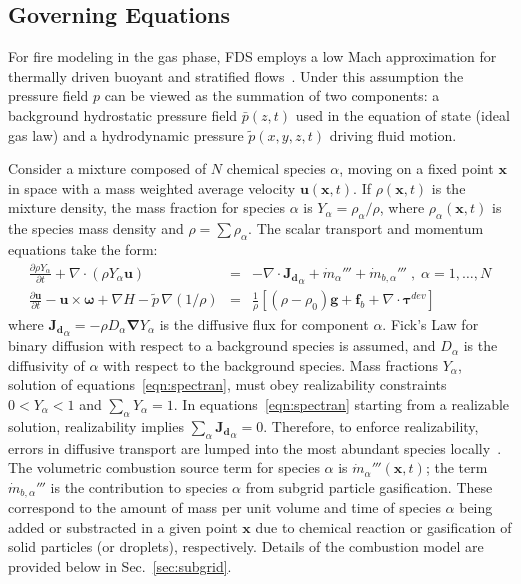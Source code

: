 \documentclass[journal,article,atmosphere,submit,moreauthors,pdftex]{Definitions/mdpi}
\begin{document}
\subsection{Governing Equations} \label{sec:goveqns}

For fire modeling in the gas phase, FDS employs a low Mach approximation for thermally driven buoyant and stratified flows~\cite{Rehm:1}. Under this assumption the pressure field $p$ can be viewed as the summation of two components: a background hydrostatic pressure field $\bar{p}(z,t)$ used in the equation of state (ideal gas law) and a hydrodynamic pressure $\tilde{p}(x,y,z,t)$ driving fluid motion.

Consider a mixture composed of $N$ chemical species $\alpha$, moving on a fixed point $\mathbf{x}$ in space with a mass weighted average velocity $\mathbf{u}(\mathbf{x},t)$. If $\rho(\mathbf{x},t)$ is the mixture density, the mass fraction for species $\alpha$ is $Y_\alpha = \rho_\alpha / \rho$, where $\rho_\alpha(\mathbf{x},t)$ is the species mass density and $\rho = \sum \rho_\alpha$. The scalar transport and momentum equations take the form:
\begin{eqnarray}
   \frac{\partial \rho Y_\alpha}{ \partial t} + \nabla \cdot ( \rho Y_\alpha  \mathbf{u} ) &=& - \nabla \cdot \mathbf{J_{d}}_\alpha + \dot{m}_\alpha'''  +
    \dot{m}_{b,\alpha}'''\; , \; \alpha=1,\dots,N \label{eqn:spectran} \\
    \frac{\partial \mathbf{u}}{\partial t} - \mathbf{u} \times \boldsymbol{\omega} + \nabla H - \tilde{p} \, \nabla \left( 1/\rho\right) &=&
    \frac{1}{\rho} \left[ (\rho-\rho_0) \mathbf{g} + \mathbf{f}_{b} + \nabla \cdot \boldsymbol{\tau}^{dev} \right] \label{eqn:momtran}
\end{eqnarray}
where $\mathbf{J_{d}}_\alpha=- \rho D_\alpha \boldsymbol{\nabla} Y_\alpha$ is the diffusive flux for component $\alpha$. Fick's Law for binary diffusion with respect to a background species is assumed, and $D_\alpha$ is the diffusivity of $\alpha$ with respect to the background species.  Mass fractions $Y_\alpha$, solution of equations~\eqref{eqn:spectran}, must obey realizability constraints $0<Y_\alpha<1$ and $\sum_\alpha Y_\alpha=1$. In equations~\eqref{eqn:spectran} starting from a realizable solution, realizability implies $\sum_\alpha \mathbf{J_{d}}_\alpha = 0$. Therefore, to enforce realizability, errors in diffusive transport are lumped into the most abundant species locally~\cite{McDermott:2015}. The volumetric combustion source term for species $\alpha$ is $\dot{m}_\alpha'''(\mathbf{x},t)$;  the term $\dot{m}_{b,\alpha}'''$ is the contribution to species $\alpha$ from subgrid particle gasification. These correspond to the amount of mass per unit volume and time of species $\alpha$ being added or substracted in a given point $\mathbf{x}$ due to chemical reaction or gasification of solid particles (or droplets), respectively.  Details of the combustion model are provided below in Sec.~\ref{sec:subgrid}.
\end{document}
